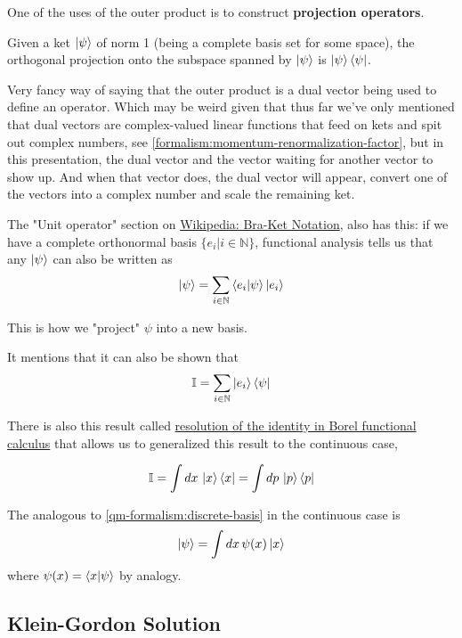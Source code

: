 One of the uses of the outer product is to construct \textbf{projection operators}.

Given a ket $\ket{\psi}$ of norm 1 (being a complete basis set for some space),
the orthogonal projection onto the subspace spanned by $\ket{\psi}$ is
$\ket{\psi}\bra{\psi}$.

Very fancy way of saying that the outer product is a dual vector being used to define an operator.
Which may be weird given that thus far we've only mentioned that dual vectors are complex-valued linear
functions that feed on kets and spit out complex numbers, see \ref{formalism:momentum-renormalization-factor},
but in this presentation, the dual vector and the vector waiting for another vector to show up.
And when that vector does, the dual vector will appear, convert one of the vectors into a complex number
and scale the remaining ket.



The "Unit operator" section on \href{https://en.wikipedia.org/wiki/Bra%E2%80%93ket_notation}{Wikipedia: Bra-Ket Notation},
also has this: if we have a complete orthonormal basis $\{ e_i | i\in\mathbb{N} \}$,
functional analysis tells us that any $\ket{\psi}$ can also be written as
\begin{equation}
\ket{\psi} =
\sum_{i\in\mathbb{N}} \braket{e_i | \psi} \ket{e_i} \label{qm-formalism:discrete-basis}
\end{equation}

This is how we "project" $\psi$ into a new basis.

It mentions that it can also be shown that
$$
\mathbb{I} = \sum_{i\in\mathbb{N}} \ket{e_i} \bra{\psi}
$$

There is also this result called
\href{https://en.wikipedia.org/wiki/Borel_functional_calculus#Resolution_of_the_identity}{resolution of the identity in Borel functional calculus}
that allows us to generalized this result to the continuous case,

$$
\mathbb{I} = \int dx \, \ket{x} \bra{x} = \int dp \, \ket{p} \bra{p}
$$


The analogous to \ref{qm-formalism:discrete-basis} in the continuous case is
$$
\ket{\psi} = \int dx\, \psi(x) \ket{x}
$$
where $\psi (x) = \braket{x | \psi}$ by analogy.
\\



\subsection{Klein-Gordon Solution}

